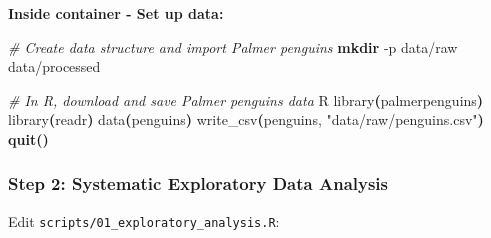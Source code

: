 \documentclass[
]{article}
\newenvironment{Shaded}{\begin{snugshade}}{\end{snugshade}}
\newcommand{\AttributeTok}[1]{\textcolor[rgb]{0.13,0.29,0.53}{#1}}
\newcommand{\CommentTok}[1]{\textcolor[rgb]{0.56,0.35,0.01}{\textit{#1}}}
\newcommand{\ErrorTok}[1]{\textcolor[rgb]{0.64,0.00,0.00}{\textbf{#1}}}
\newcommand{\ExtensionTok}[1]{#1}
\newcommand{\FunctionTok}[1]{\textcolor[rgb]{0.13,0.29,0.53}{\textbf{#1}}}
\newcommand{\KeywordTok}[1]{\textcolor[rgb]{0.13,0.29,0.53}{\textbf{#1}}}
\newcommand{\NormalTok}[1]{#1}
\newcommand{\StringTok}[1]{\textcolor[rgb]{0.31,0.60,0.02}{#1}}
\begin{document}
\textbf{Inside container - Set up data:}

\begin{Shaded}
\begin{Highlighting}[]
\CommentTok{\# Create data structure and import Palmer penguins}
\FunctionTok{mkdir} \AttributeTok{{-}p}\NormalTok{ data/raw data/processed}

\CommentTok{\# In R, download and save Palmer penguins data}
\ExtensionTok{R}
\ExtensionTok{library}\ErrorTok{(}\ExtensionTok{palmerpenguins}\KeywordTok{)}
\ExtensionTok{library}\ErrorTok{(}\ExtensionTok{readr}\KeywordTok{)}
\ExtensionTok{data}\ErrorTok{(}\ExtensionTok{penguins}\KeywordTok{)}
\ExtensionTok{write\_csv}\ErrorTok{(}\ExtensionTok{penguins,} \StringTok{"data/raw/penguins.csv"}\KeywordTok{)}
\FunctionTok{quit()}
\end{Highlighting}
\end{Shaded}

\subsubsection{Step 2: Systematic Exploratory Data
Analysis}\label{step-2-systematic-exploratory-data-analysis}

Edit \texttt{scripts/01\_exploratory\_analysis.R}:
\end{document}
